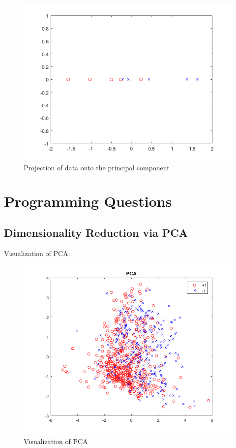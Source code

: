 \documentclass[12pt]{article}
\begin{document}
\begin{figure}[h!]
\begin{center}
\includegraphics[scale=1.2]{TQ2_e.png}
\caption{Projection of data onto the principal component}
\end{center}
\end{figure}

\newpage

\section{Programming Questions}
\subsection{Dimensionality Reduction via PCA}

Visualization of PCA:

\begin{figure}[h!]
\begin{center}
\includegraphics[scale=1.1]{PCA.png}
\caption{Visualization of PCA}
\end{center}
\end{figure}
\end{document}

